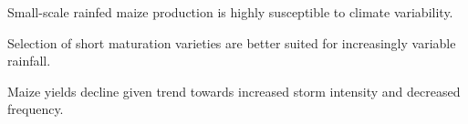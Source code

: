 \documentclass[draft]{agujournal2019}
\begin{document}





\begin{keypoints}
\item Small-scale rainfed maize production is highly susceptible to climate variability.
\item Selection of short maturation varieties are better suited for increasingly variable rainfall.
\item Maize yields decline given trend towards increased storm intensity and decreased frequency.
\end{keypoints}

%
%

%
%
\end{document}
